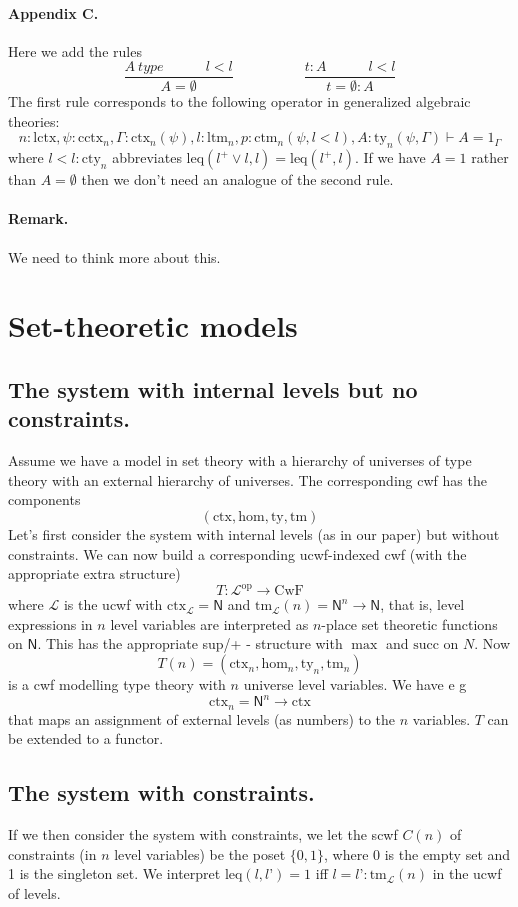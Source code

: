 \documentclass[11pt,a4paper]{article}
\theoremstyle{definition}
\newcommand{\Ctx}{\mathrm{Ctx}}
\newcommand{\Ty}{\mathrm{Ty}}
\newcommand{\Tm}{\mathrm{Tm}}
\newcommand{\op}{\mathrm{op}}
\newcommand{\N}{\mathsf{N}}
\def\Ctx{\mathrm{ctx}}
\def\Ty{\mathrm{ty}}
\def\Tm{\mathrm{tm}}
\def\Hom{\mathrm{hom}}
\def\lctx{\mathrm{lctx}}
\def\ltm{\mathrm{ltm}}
\def\leq{\mathrm{leq}}
\def\cctx{\mathrm{cctx}}
\def\cty{\mathrm{cty}}
\def\ctm{\mathrm{ctm}}
\newcommand{\ctx}{\mathrm{ctx}}
\newcommand{\ty}{\mathrm{ty}}
\def\L{{\mathcal{L}}}
\def\CwF{\mathrm{CwF}}
\begin{document}
\paragraph{Appendix C.} Here we add the rules
$$
\frac{A\ type\hspace{3em}l < l}{A = \emptyset}
\hspace{5em}
\frac{t : A\hspace{3em}l < l}{t = \emptyset : A}
$$
The first rule corresponds to the following operator in generalized algebraic theories:
$$
n : \lctx, \psi : \cctx_n, \Gamma : \ctx_n(\psi), l : \ltm_n, p : \ctm_n(\psi,l < l), A : \ty_n(\psi,\Gamma)
\vdash
A = 1_\Gamma
$$
where $l < l : \cty_n$ abbreviates $\leq(l^+ \vee l,l) = \leq(l^+,l)$. If we have $A = 1$ rather than $A = \emptyset$ then we don't need an analogue of the second rule.  


\paragraph{Remark.} We need to think more about this.

\section{Set-theoretic models}

\subsection{The system with internal levels but no constraints.}
Assume we have a model in set theory with a hierarchy of universes of type theory with an external hierarchy of universes. The corresponding cwf has the components
 $$
(\Ctx, \Hom, \Ty, \Tm)
 $$
Let’s first consider the system with internal levels (as in our paper) but without constraints. We can now build a corresponding ucwf-indexed cwf (with the appropriate extra structure)
 $$
T : \L^{\op} \to \CwF
$$
where $\L$ is the ucwf with $\Ctx_\L = \N$ and $\Tm_\L(n) = \N^n \to \N$, that is, level expressions in $n$ level variables are interpreted as $n$-place set theoretic functions on $\N$. This has the appropriate sup/+ - structure with $\max$ and $\mathrm{succ}$ on $N$. Now
 $$
T(n) = (\Ctx_n, \Hom_n, \Ty_n, \Tm_n)
 $$
is a cwf modelling type theory with $n$ universe level variables. We have e g
 $$
\Ctx_n = \N^n \to \Ctx
 $$
that maps an assignment of external levels (as numbers) to the $n$ variables. $T$ can be extended to a functor.
 
\subsection{The system with constraints.}
If we then consider the system with constraints, we let the scwf $C(n)$ of constraints (in $n$ level variables) be the poset $\{0,1\}$, where 0 is the empty set and 1 is the singleton set. We interpret $\leq(l,l’) = 1$ iff $l = l’ : \Tm_\L(n)$ in the ucwf of levels.
 
\end{document}
